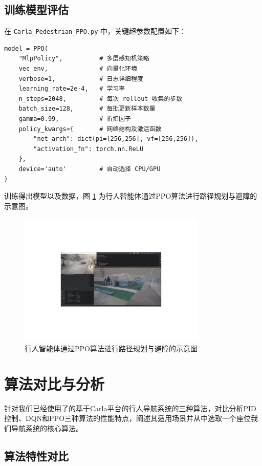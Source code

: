 \subsection{训练模型评估}
在 \texttt{Carla\_Pedestrian\_PPO.py} 中，关键超参数配置如下：
\begin{verbatim}
model = PPO(
    "MlpPolicy",          # 多层感知机策略
    vec_env,              # 向量化环境
    verbose=1,            # 日志详细程度
    learning_rate=2e-4,   # 学习率
    n_steps=2048,         # 每次 rollout 收集的步数
    batch_size=128,       # 每批更新样本数量
    gamma=0.99,           # 折扣因子
    policy_kwargs={       # 网络结构及激活函数
        "net_arch": dict(pi=[256,256], vf=[256,256]),
        "activation_fn": torch.nn.ReLU
    },
    device='auto'         # 自动选择 CPU/GPU
)
\end{verbatim}

训练得出模型以及数据，图 \ref{fig:path_planning} 为行人智能体通过PPO算法进行路径规划与避障的示意图。

\begin{figure}[H]
    \centering
    \includegraphics[width=0.8\textwidth]{images/path_planning.pdf}
    \caption{行人智能体通过PPO算法进行路径规划与避障的示意图}
    \label{fig:path_planning}
\end{figure}

\section{算法对比与分析}

针对我们已经使用了的基于Carla平台的行人导航系统的三种算法，对比分析PID控制、DQN和PPO三种算法的性能特点，阐述其适用场景并从中选取一个座位我们导航系统的核心算法。

\subsection{算法特性对比}

